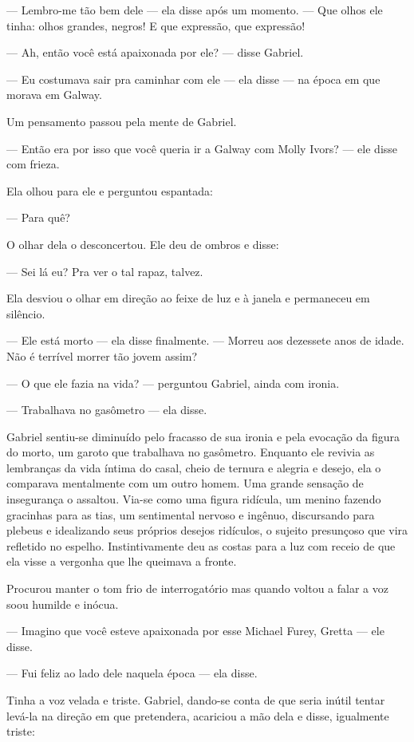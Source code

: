 --- Lembro-me tão bem dele --- ela disse após um momento.  --- Que olhos ele
tinha: olhos grandes, negros!  E que expressão, que expressão!

--- Ah, então você está apaixonada por ele? --- disse Gabriel.

--- Eu costumava sair pra caminhar com ele --- ela disse --- na época em que
morava em Galway.

Um pensamento passou pela mente de Gabriel.

--- Então era por isso que você queria ir a Galway com Molly Ivors? --- ele
disse com frieza.

Ela olhou para ele e perguntou espantada:

--- Para quê?

O olhar dela o desconcertou.  Ele deu de ombros e disse:

--- Sei lá eu?  Pra ver o tal rapaz, talvez.

Ela desviou o olhar em direção ao feixe de luz e à janela e permaneceu em
silêncio.

--- Ele está morto --- ela disse finalmente.  --- Morreu aos dezessete anos de
idade.  Não é terrível morrer tão jovem assim?

--- O que ele fazia na vida? --- perguntou Gabriel, ainda com ironia.

--- Trabalhava no gasômetro --- ela disse.

Gabriel sentiu-se diminuído pelo fracasso de sua ironia e pela evocação da
figura do morto, um garoto que trabalhava no gasômetro.  Enquanto ele revivia
as lembranças da vida íntima do casal, cheio de ternura e alegria e desejo, ela
o comparava mentalmente com um outro homem.  Uma grande sensação de insegurança
o assaltou.  Via-se como uma figura ridícula, um menino fazendo gracinhas para
as tias, um sentimental nervoso e ingênuo, discursando para plebeus e
idealizando seus próprios desejos ridículos, o sujeito presunçoso que vira
refletido no espelho.  Instintivamente deu as costas para a luz com receio de
que ela visse a vergonha que lhe queimava a fronte.

Procurou manter o tom frio de interrogatório mas quando voltou a falar a voz
soou humilde e inócua.

--- Imagino que você esteve apaixonada por esse Michael Furey, Gretta --- ele
disse.

--- Fui feliz ao lado dele naquela época --- ela disse.

Tinha a voz velada e triste.  Gabriel, dando-se conta de que seria inútil
tentar levá-la na direção em que pretendera, acariciou a mão dela e disse,
igualmente triste:

